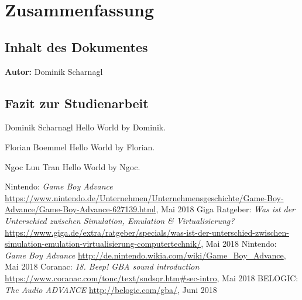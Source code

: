 \documentclass[11pt,a4paper]{scrartcl}
\newcommand{\AutorDominik} {
    \vspace{-4mm}
    \large \textbf{Autor:} Dominik Scharnagl \normalsize
    \vspace{2mm}
}
\begin{document}
\newpage


\section{Zusammenfassung} \label{Zusammenfassung}


\subsection{Inhalt des Dokumentes}
\AutorDominik

\subsection{Fazit zur Studienarbeit}

\large Dominik Scharnagl
\vspace{2mm}\newline
Hello World by Dominik.

\vspace{5mm}
\large Florian Boemmel
\vspace{2mm}\newline
Hello World by Florian.

\vspace{5mm}
\large Ngoc Luu Tran
\vspace{2mm}\newline
Hello World by Ngoc.


\newpage
{}

\begin{thebibliography}{tiefe}
    Nintendo: \textit{Game Boy Advance}\newline
    \url{https://www.nintendo.de/Unternehmen/Unternehmensgeschichte/Game-Boy-Advance/Game-Boy-Advance-627139.html}, Mai 2018
    Giga Ratgeber: \textit{Was ist der Unterschied zwischen Simulation, Emulation \& Virtualisierung?}\newline
    \url{https://www.giga.de/extra/ratgeber/specials/was-ist-der-unterschied-zwischen-simulation-emulation-virtualisierung-computertechnik/}, Mai 2018
    Nintendo: \textit{Game Boy Advance}\newline
    \url{http://de.nintendo.wikia.com/wiki/Game_Boy_Advance}, Mai 2018
    Coranac: \textit{18. Beep! GBA sound introduction}\newline
    \url{https://www.coranac.com/tonc/text/sndsqr.htm#sec-intro}, Mai 2018
    BELOGIC: \textit{The Audio ADVANCE}\newline
    \url{http://belogic.com/gba/}, Juni 2018
\end{thebibliography}
\end{document}
